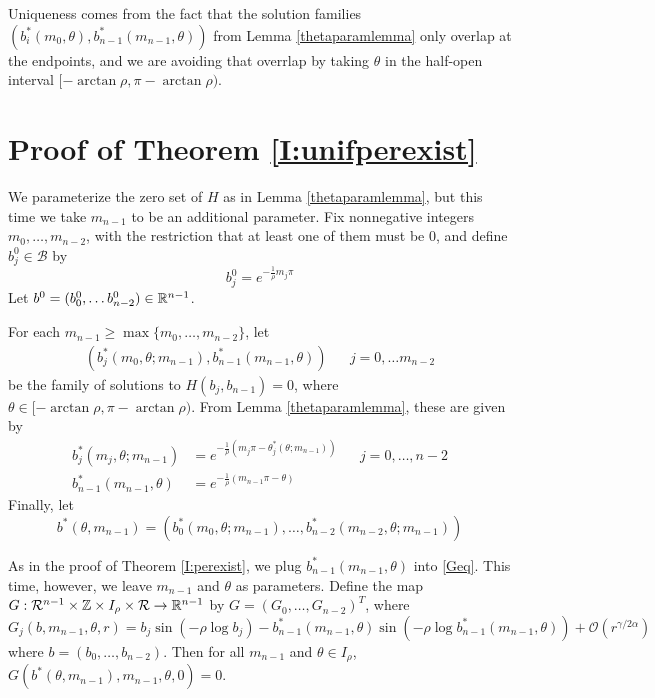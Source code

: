 \documentclass[thesis.tex]{subfiles}
\begin{document}
Uniqueness comes from the fact that the solution families $(b_i^*(m_0, \theta), b_{n-1}^*(m_{n-1}, \theta))$ from Lemma \eqref{thetaparamlemma} only overlap at the endpoints, and we are avoiding that overrlap by taking $\theta$ in the half-open interval $[-\arctan \rho, \pi - \arctan \rho)$. 

\section{Proof of Theorem \ref{I:unifperexist}}

We parameterize the zero set of $H$ as in Lemma \ref{thetaparamlemma}, but this time we take $m_{n-1}$ to be an additional parameter. Fix nonnegative integers $m_0, \dots, m_{n-2}$, with the restriction that at least one of them must be 0, and define $b_j^0 \in \mathcal{B}$ by
\[
b_j^0 = e^{-\frac{1}{\rho}m_j \pi}
\]
Let $b^0 = (b_0^0, \dots b_{n-2}^0) \in {\mathbb R}^{n-1}$.

For each $m_{n-1} \geq \max\{ m_0, \dots, m_{n-2} \}$, let
\begin{align}
(b_j^*(m_0, \theta; m_{n-1}), b_{n-1}^*(m_{n-1}, \theta)) && j = 0, \dots m_{n-2}
\end{align}
be the family of solutions to $H(b_j, b_{n-1}) = 0$, where $\theta \in [-\arctan \rho, \pi - \arctan \rho)$. From Lemma \ref{thetaparamlemma}, these are given by
\begin{equation}\label{bstarm}
\begin{aligned}
b_j^*(m_j, \theta; m_{n-1}) &= e^{-\frac{1}{\rho}(m_j \pi - \theta_j^*(\theta; m_{n-1}))} && j = 0, \dots, n-2 \\
b_{n-1}^*(m_{n-1}, \theta) &= e^{-\frac{1}{\rho}(m_{n-1}\pi - \theta)}
\end{aligned}
\end{equation}
Finally, let
\begin{equation}\label{defbstar}
b^*(\theta, m_{n-1}) = 
\left( b_0^*(m_0, \theta; m_{n-1}), \dots, b_{n-2}^*(m_{n-2}, \theta; m_{n-1}) \right)
\end{equation}

As in the proof of Theorem \ref{I:perexist}, we plug $b_{n-1}^*(m_{n-1}, \theta)$ into \eqref{Geq}. This time, however, we leave $m_{n-1}$ and $\theta$ as parameters. Define the map $G: \mathcal{R}^{n-1} \times {\mathbb Z} \times I_\rho \times \mathcal{R} \rightarrow {\mathbb R}^{n-1}$ by $G = (G_0, \dots, G_{n-2})^T$, where 
\begin{equation}\label{Gdef2}
G_j(b, m_{n-1}, \theta, r) = b_j \sin \left( -\rho \log b_j \right) - b_{n-1}^*(m_{n-1}, \theta) \sin \left( -\rho \log b_{n-1}^*(m_{n-1}, \theta) \right) + \mathcal{O}(r^{\gamma / 2 \alpha})
\end{equation}
where $b = (b_0, \dots, b_{n-2})$. Then for all $m_{n-1}$ and $\theta \in I_\rho$, $G(b^*(\theta, m_{n-1}), m_{n-1}, \theta, 0) = 0$.
\end{document}
